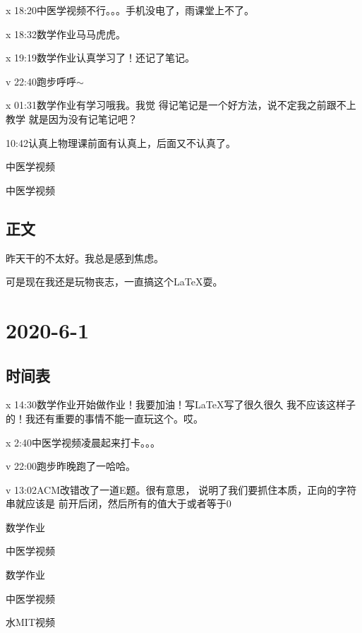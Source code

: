 \documentclass{peterlitsdoc}
\begin{document}
\begin{pltplan}
\item[x]{18:20}{中医学视频}{不行。。。手机没电了，雨课堂上不了。}
\item[x]{18:32}{数学作业}{马马虎虎。}
\item[x]{19:19}{数学作业}{认真学习了！还记了笔记。}
\item[v]{22:40}{跑步}{呼呼$\sim$}
\item[x]{01:31}{数学作业}{有学习哦我。我觉
    得记笔记是一个好方法，说不定我之前跟不上教学
    就是因为没有记笔记吧？}
\item[ ]{10:42}{认真上物理课}{前面有认真上，后面又不认真了。}
\item[ ]{}{中医学视频}{}
\item[ ]{}{中医学视频}{}
\end{pltplan}

\subsection{正文}

昨天干的不太好。我总是感到焦虑。

可是现在我还是玩物丧志，一直搞这个\LaTeX{}耍。

\section{2020-6-1}

\subsection{时间表}
\begin{pltplan}
\item[x]{14:30}{数学作业}{开始做作业！我要加油！写\LaTeX{}写了很久很久
    我不应该这样子的！我还有重要的事情不能一直玩这个。哎。}
\item[x]{2:40}{中医学视频}{凌晨起来打卡。。。}
\item[v]{22:00}{跑步}{昨晚跑了一哈哈。}
\item[v]{13:02}{ACM改错}{改了一道E题。很有意思，
    说明了我们要抓住本质，正向的字符串就应该是
    前开后闭，然后所有的值大于或者等于0}
\item[ ]{}{数学作业}{}
\item[ ]{}{中医学视频}{}
\item[ ]{}{数学作业}{}
\item[ ]{}{中医学视频}{}
\item[ ]{}{水MIT视频}{}
\end{pltplan}
\end{document}
